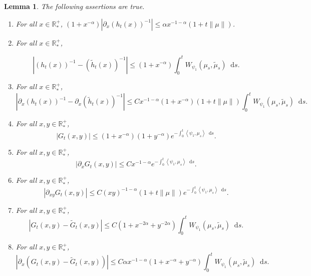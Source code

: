\documentclass[11pt,a4paper]{article}
\newcommand{\RRP}{\mathbb{R}^+_*}
\newcommand{\brac}[1]{\left\langle#1\right\rangle}
\newcommand{\dd}{\mathop{}\!\mathrm{d}}
\newtheorem{lemma}[theorem]{Lemma}
\begin{document}
\begin{lemma}\label{lem:technical_G_h}
    The following assertions are true.
    \begin{enumerate}[label=(\roman*)]
        \item For all $x \in \RRP$, $(1 + x^{-\alpha})\left|\partial_x \left( h_t(x)\right)^{-1} \right|\leq \alpha x^{-1-\alpha}\left(1 + t\|\mu\| \right) $.
        \item For all $x \in \RRP$, 
        
        \[\left|\left( h_t(x)\right)^{-1}-\left( \tilde{h}_t(x)\right)^{-1} \right|\leq (1 + x^{-\alpha})\int_0^t W_{\psi_1}(\mu_s,\tilde{\mu}_s) \dd s. \]
        \item For all $x \in \RRP$,
        \[
            \left|\partial_x \left( h_t(x)\right)^{-1}- \partial_x\left( \tilde{h}_t(x)\right)^{-1} \right|\leq Cx^{-1-\alpha} (1 + x^{-\alpha})\left(1 + t\|\mu\| \right) \int_0^t W_{\psi_1}(\mu_s,\tilde{\mu}_s) \dd s.
         \]
        \item For all $x,y \in \RRP$, 
        \[|G_t(x,y)| \leq (1 + x^{-\alpha})(1 + y^{-\alpha})e^{-\int_0^t \brac{\psi_1,\mu_s}\dd s}.
        \]
        \item For all $x,y \in \RRP$, 
        \[\left|\partial_x G_t(x,y) \right| \leq C   x^{-1-\alpha} e^{-\int_0^t \brac{\psi_1,\mu_s}\dd s}.
        \]
        \item For all $x,y \in \RRP$, 
        \[ \left|\partial_{xy}G_t(x,y) \right| \leq C(xy)^{-1-\alpha} \left(1 + t\|\mu\| \right) e^{-\int_0^t \brac{\psi_1,\mu_s}\dd s}.
        \]
        \item For all $x,y \in \RRP$,
        \[\left|G_t(x,y)- \tilde{G}_t(x,y)\right| \leq C(1 + x^{-2\alpha} + y^{-2\alpha})\int_0^t W_{\psi_1}(\mu_s,\tilde{\mu}_s) \dd s .
        \]
        \item For all $x,y \in \RRP$, 
        \[\left|\partial_x \left(G_t(x,y)- \tilde{G}_t(x,y)\right)  \right| \leq C\alpha x^{-1-\alpha}(1 + x^{-\alpha} + y^{-\alpha})\int_0^t W_{\psi_1}(\mu_s,\tilde{\mu}_s) \dd s.
        \]
    \end{enumerate}
\end{lemma}
\end{document}
